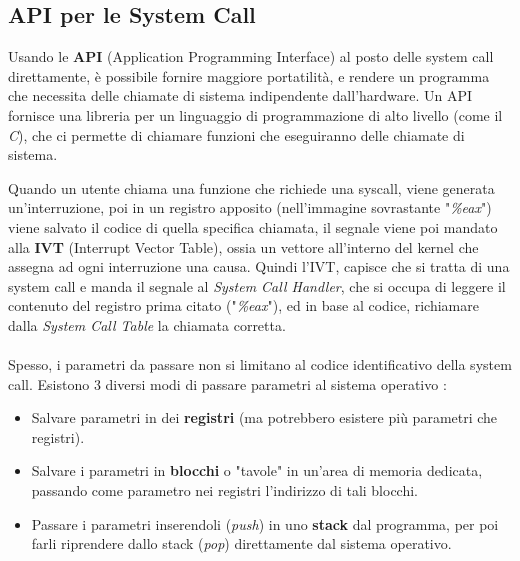 \documentclass[12pt, letterpaper]{article}
\begin{document}
\subsection{API per le System Call}
Usando le \textbf{API} (Application Programming Interface) al posto delle system call direttamente, è possibile 
fornire maggiore portatilità, e rendere un programma che necessita delle chiamate di sistema indipendente 
dall'hardware. Un API fornisce una libreria per un linguaggio di programmazione di alto livello (come il \textit{C}), 
che ci permette di chiamare funzioni che eseguiranno delle chiamate di sistema.
\begin{figure}[h]
\end{figure}
\newpage
Quando un utente chiama una funzione che richiede una syscall, viene generata un'interruzione, poi in un registro apposito 
(nell'immagine sovrastante "\textit{\%eax}") viene salvato il codice di quella specifica chiamata,
il segnale viene poi mandato alla \textbf{IVT} (Interrupt Vector Table), ossia un vettore all'interno 
del kernel che assegna ad ogni interruzione una causa. Quindi l'IVT, capisce che si tratta di una system call 
e manda il segnale al \textit{System Call Handler}, che si occupa di leggere il contenuto del registro 
prima citato ("\textit{\%eax}"), ed in base al codice, richiamare dalla \textit{System Call Table} la chiamata 
corretta.\\\hphantom{.}\\
Spesso, i parametri da passare non si limitano al codice identificativo della system call. Esistono 3 
diversi modi di passare parametri al sistema operativo :
\begin{itemize}
    \item Salvare parametri in dei \textbf{registri} (ma potrebbero esistere più parametri che registri).
    \item Salvare i parametri in \textbf{blocchi} o "tavole" in un'area di memoria dedicata, passando come 
    parametro nei registri l'indirizzo di tali blocchi.
    \item Passare i parametri inserendoli (\textit{push}) in uno \textbf{stack} dal programma, per poi farli 
    riprendere dallo stack (\textit{pop}) direttamente dal sistema operativo.
\end{itemize}
\end{document}
